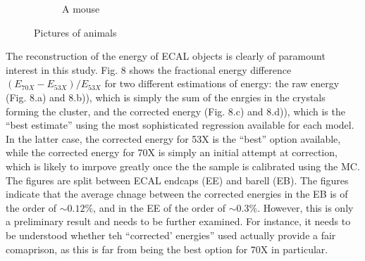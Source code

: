 \documentclass[10pt]{article}
\begin{document}
\begin{figure}[h!]
\begin{subfigure}[b]{0.4\textwidth}
                \caption{A mouse}
                \label{fig:mouse}
        \end{subfigure}
        \caption{Pictures of animals}\label{fig:animals}
\end{figure}

The reconstruction of the energy of ECAL objects is clearly of paramount interest in this study. Fig. 8 shows the fractional energy difference $(E_{70X}-E_{53X})/E_{53X}$ for two different estimations of energy: the raw energy (Fig. 8.a) and 8.b)), which is simply the sum of the enrgies in the crystals forming the cluster, and the corrected energy (Fig. 8.c) and 8.d)), which is the ``best estimate'' using the most sophisticated regression available for each model. In the latter case, the corrected energy for 53X is the ``best'' option available, while the corrected energy for 70X is simply an initial attempt at correction, which is likely to imrpove greatly once the the sample is calibrated using the MC. The figures are split between ECAL endcaps (EE) and barell (EB). The figures indicate that the average chnage between the corrected energies in the EB is of the order of $\sim 0.12\%$, and in the EE of the order of $\sim0.3\%$. However, this is only a preliminary result and needs to be further examined. For instance, it needs to be understood whether teh ``corrected' energies'' used actually provide a fair comaprison, as this is far from being the best option for 70X in particular.
\end{document}

